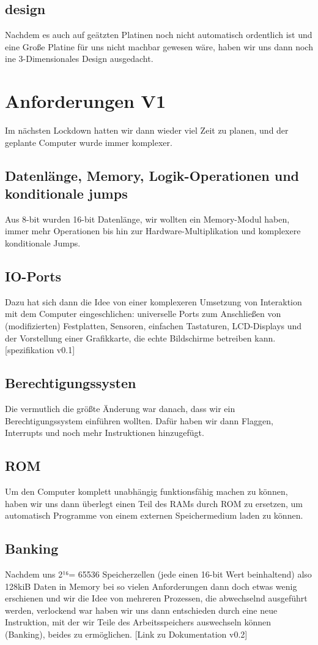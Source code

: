 \documentclass{scrartcl}
\begin{document}
    \subsection{design}
    Nachdem es auch auf geätzten Platinen noch nicht automatisch ordentlich ist und eine Große Platine für uns nicht machbar gewesen wäre, haben wir uns dann noch ine 3-Dimensionales Design ausgedacht.

    \section{Anforderungen V1}
    Im nächsten Lockdown hatten wir dann wieder viel Zeit zu planen, und der geplante Computer wurde immer komplexer.
    \subsection{Datenlänge, Memory, Logik-Operationen und konditionale jumps}
    Aus 8-bit wurden 16-bit Datenlänge, wir wollten ein Memory-Modul haben, immer mehr Operationen bis hin zur Hardware-Multiplikation und komplexere konditionale Jumps.
    \subsection{IO-Ports}
    Dazu hat sich dann die Idee von einer komplexeren Umsetzung von Interaktion mit dem Computer eingeschlichen:
    universelle Ports zum Anschließen von (modifizierten) Festplatten, Sensoren, einfachen Tastaturen, LCD-Displays und der Vorstellung einer Grafikkarte, die echte Bildschirme betreiben kann.
    [spezifikation v0.1]

    \subsection{Berechtigungssysten}
    Die vermutlich die größte Änderung war danach, dass wir ein Berechtigungssystem einführen wollten.
    Dafür haben wir dann Flaggen, Interrupts und noch mehr Instruktionen hinzugefügt.
    \subsection{ROM}
    Um den Computer komplett unabhängig funktionsfähig machen zu können, haben wir uns dann überlegt einen Teil des RAMs durch ROM zu ersetzen, um automatisch Programme von einem externen Speichermedium laden zu können.
    \subsection{Banking}
    Nachdem uns 2¹⁶= 65536 Speicherzellen (jede einen 16-bit Wert beinhaltend) also 128kiB Daten in Memory bei so vielen Anforderungen dann doch etwas wenig erschienen
    und wir die Idee von mehreren Prozessen, die abwechselnd ausgeführt werden, verlockend war haben wir uns dann entschieden durch eine neue Instruktion, mit der wir Teile des Arbeitsspeichers auswechseln können (Banking),
    beides zu ermöglichen. [Link zu Dokumentation v0.2]
\end{document}
